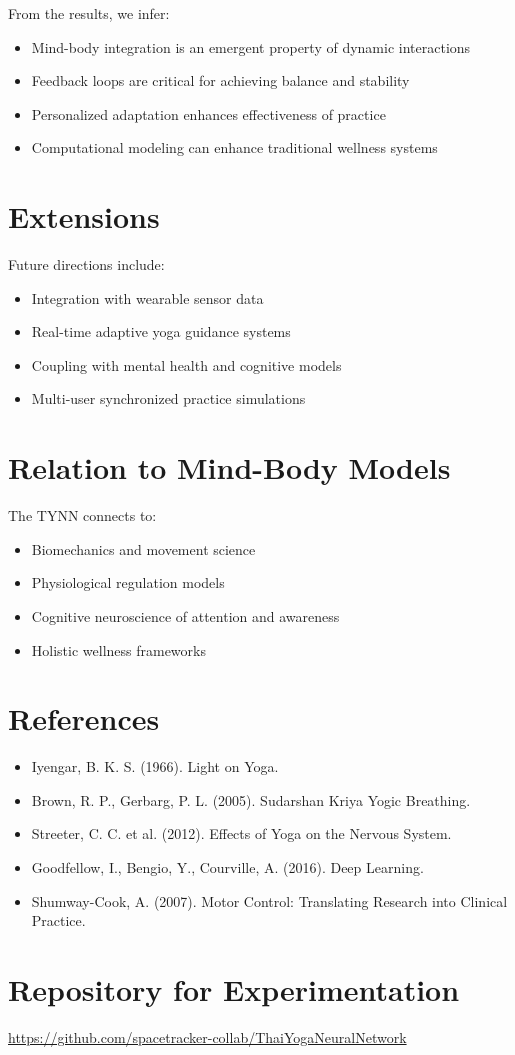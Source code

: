 \documentclass[12pt]{article}
\begin{document}
From the results, we infer:

\begin{itemize}
\item Mind-body integration is an emergent property of dynamic interactions
\item Feedback loops are critical for achieving balance and stability
\item Personalized adaptation enhances effectiveness of practice
\item Computational modeling can enhance traditional wellness systems
\end{itemize}

\section{Extensions}

Future directions include:

\begin{itemize}
\item Integration with wearable sensor data
\item Real-time adaptive yoga guidance systems
\item Coupling with mental health and cognitive models
\item Multi-user synchronized practice simulations
\end{itemize}

\section{Relation to Mind-Body Models}

The TYNN connects to:

\begin{itemize}
\item Biomechanics and movement science
\item Physiological regulation models
\item Cognitive neuroscience of attention and awareness
\item Holistic wellness frameworks
\end{itemize}

\section{References}

\begin{itemize}
\item Iyengar, B. K. S. (1966). Light on Yoga.
\item Brown, R. P., Gerbarg, P. L. (2005). Sudarshan Kriya Yogic Breathing.
\item Streeter, C. C. et al. (2012). Effects of Yoga on the Nervous System.
\item Goodfellow, I., Bengio, Y., Courville, A. (2016). Deep Learning.
\item Shumway-Cook, A. (2007). Motor Control: Translating Research into Clinical Practice.
\end{itemize}

\section{Repository for Experimentation}

\noindent
\url{https://github.com/spacetracker-collab/ThaiYogaNeuralNetwork}
\end{document}
